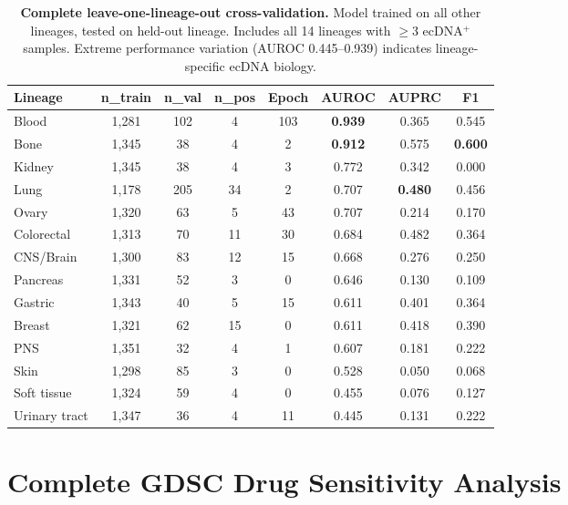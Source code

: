 \documentclass{article}
\begin{document}
\begin{table}[h]
\caption{\textbf{Complete leave-one-lineage-out cross-validation.} Model trained on all other lineages, tested on held-out lineage. Includes all 14 lineages with $\geq$3 ecDNA$^+$ samples. Extreme performance variation (AUROC 0.445--0.939) indicates lineage-specific ecDNA biology.}
\label{tab:loocv_main}
\centering
\small
\begin{tabular}{@{}lccccccc@{}}
\toprule
Lineage & n\_train & n\_val & n\_pos & Epoch & AUROC & AUPRC & F1 \\
\midrule
Blood & 1,281 & 102 & 4 & 103 & \textbf{0.939} & 0.365 & 0.545 \\
Bone & 1,345 & 38 & 4 & 2 & \textbf{0.912} & 0.575 & \textbf{0.600} \\
Kidney & 1,345 & 38 & 4 & 3 & 0.772 & 0.342 & 0.000 \\
Lung & 1,178 & 205 & 34 & 2 & 0.707 & \textbf{0.480} & 0.456 \\
Ovary & 1,320 & 63 & 5 & 43 & 0.707 & 0.214 & 0.170 \\
Colorectal & 1,313 & 70 & 11 & 30 & 0.684 & 0.482 & 0.364 \\
CNS/Brain & 1,300 & 83 & 12 & 15 & 0.668 & 0.276 & 0.250 \\
Pancreas & 1,331 & 52 & 3 & 0 & 0.646 & 0.130 & 0.109 \\
Gastric & 1,343 & 40 & 5 & 15 & 0.611 & 0.401 & 0.364 \\
Breast & 1,321 & 62 & 15 & 0 & 0.611 & 0.418 & 0.390 \\
PNS & 1,351 & 32 & 4 & 1 & 0.607 & 0.181 & 0.222 \\
Skin & 1,298 & 85 & 3 & 0 & 0.528 & 0.050 & 0.068 \\
Soft tissue & 1,324 & 59 & 4 & 0 & 0.455 & 0.076 & 0.127 \\
Urinary tract & 1,347 & 36 & 4 & 11 & 0.445 & 0.131 & 0.222 \\
\bottomrule
\end{tabular}
\end{table}


\section{Complete GDSC Drug Sensitivity Analysis}
\label{app:gdsc}
\end{document}
